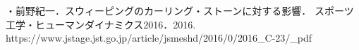\documentclass[main]{subfiles}
\begin{document}
{}
・前野紀一．スウィーピングのカーリング・ストーンに対する影響．
スポーツ工学・ヒューマンダイナミクス2016．2016.
https://www.jstage.jst.go.jp/article/jsmeshd/2016/0/2016_C-23/_pdf
\printbibliography[title=参考文献]
\end{document}
